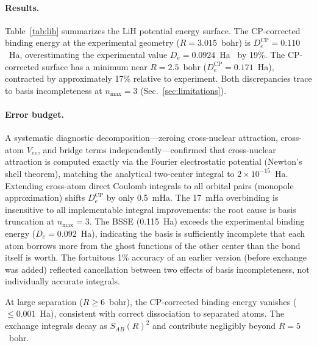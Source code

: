 \documentclass[aps,pra,twocolumn,superscriptaddress,longbibliography,floatfix]{revtex4-2}
\begin{document}
\paragraph{Results.}
Table~\ref{tab:lih} summarizes the LiH potential energy surface.
The CP-corrected binding energy at the experimental geometry
($R = 3.015$~bohr) is $D_e^{\text{CP}} = 0.110$~Ha, overestimating
the experimental value $D_e = 0.0924$~Ha~\cite{Huber1979} by 19\%.
The CP-corrected surface has a minimum near $R = 2.5$~bohr
($D_e^{\text{CP}} = 0.171$~Ha), contracted by approximately 17\%
relative to experiment. Both discrepancies trace to basis incompleteness at $n_{\max}=3$
(Sec.~\ref{sec:limitations}).

\paragraph{Error budget.}
A systematic diagnostic decomposition---zeroing cross-nuclear attraction,
cross-atom $V_{ee}$, and bridge terms independently---confirmed that
cross-nuclear attraction is computed exactly via the Fourier electrostatic
potential (Newton's shell theorem), matching the analytical two-center
integral to $2 \times 10^{-15}$~Ha. Extending cross-atom direct Coulomb
integrals to all orbital pairs (monopole approximation) shifts
$D_e^{\text{CP}}$ by only 0.5~mHa. The 17~mHa overbinding is insensitive
to all implementable integral improvements: the root cause is basis
truncation at $n_{\max}=3$. The BSSE (0.115~Ha) exceeds the experimental
binding energy ($D_e = 0.092$~Ha), indicating the basis is sufficiently
incomplete that each atom borrows more from the ghost functions of the
other center than the bond itself is worth. The fortuitous 1\% accuracy
of an earlier version (before exchange was added) reflected cancellation
between two effects of basis incompleteness, not individually accurate
integrals.

At large separation ($R \geq 6$~bohr), the CP-corrected binding energy
vanishes ($\leq 0.001$~Ha), consistent with correct dissociation to
separated atoms. The exchange integrals decay as $S_{AB}(R)^2$ and
contribute negligibly beyond $R = 5$~bohr.
\end{document}
